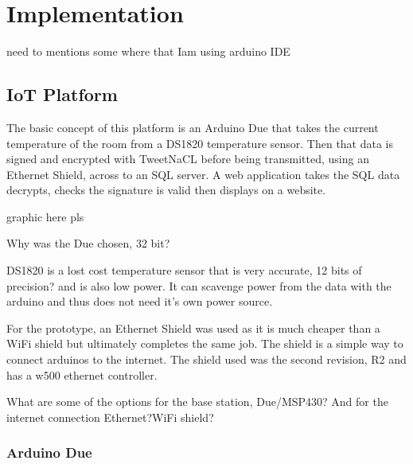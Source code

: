 
\chapter{Implementation}
\label{imple}

need to mentions some where that Iam using arduino IDE

\section{IoT Platform}

The basic concept of this platform is an Arduino Due that takes the current temperature of the room from a DS1820 temperature sensor. Then that data is signed and encrypted with TweetNaCL before being transmitted, using an Ethernet Shield, across to an SQL server. A web application takes the SQL data decrypts, checks the signature is valid then displays on a website. 

graphic here pls

Why was the Due chosen, 32 bit?

DS1820 is a lost cost temperature sensor that is very accurate, 12 bits of precision? and is also low power. It can scavenge power from the data with the arduino and thus does not need it's own power source. 


For the prototype, an Ethernet Shield was used as it is much cheaper than a WiFi shield but ultimately completes the same job. The shield is a simple way to connect arduinos to the internet. The shield used was the second revision, R2 and has a w500 ethernet controller. 


What are some of the options for the base station, Due/MSP430?  And for the internet connection   Ethernet?WiFi shield?

\subsection{Arduino Due}

